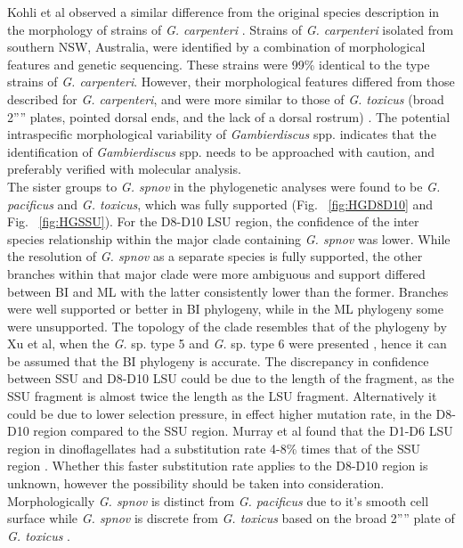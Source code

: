 \documentclass[12pt]{article}
\begin{document}
Kohli et al observed a similar difference from the original species description in the morphology of strains of  \emph{G. carpenteri} \citep{kohli2014high}. Strains of \emph{G. carpenteri} isolated from southern NSW, Australia, were identified by a combination of morphological features and genetic sequencing. These strains were 99\% identical to the type strains of \textit{G. carpenteri}. However, their morphological features differed from those described for \textit{G. carpenteri}, and were more similar to those of \emph{G. toxicus} (broad 2'''' plates, pointed dorsal ends, and the lack of a dorsal rostrum) \citep{kohli2014high,litaker2009taxonomy}.
The potential intraspecific morphological variability of \emph{Gambierdiscus} spp. indicates that the identification of \emph{Gambierdiscus} spp. needs to be approached with caution, and preferably verified with molecular analysis.\\
The sister groups to \emph{G. spnov} in the phylogenetic analyses were found to be \emph{G. pacificus} and \emph{G. toxicus}, which was fully supported (Fig. ~\ref{fig:HGD8D10} and Fig. ~\ref{fig:HGSSU}). For the D8-D10 LSU region, the confidence of the inter species relationship within the major clade containing \emph{G. spnov} was lower.  While the resolution of \emph{G. spnov} as a separate species is fully supported, the other branches within that major clade were more ambiguous and support differed between BI and ML with the latter consistently lower than the former. Branches were well supported or better in BI phylogeny, while in the ML phylogeny some were unsupported. The topology of the clade resembles that of the phylogeny by Xu et al, when the \emph{G.} sp. type 5 and \emph{G.} sp. type 6 were presented \citep{xu2014distribution}, hence it can be assumed that the BI phylogeny is accurate.
The discrepancy in confidence between SSU and D8-D10 LSU could be due to the length of the fragment, as the SSU fragment is almost twice the length as the LSU fragment. Alternatively it could be due to lower selection pressure, in effect higher mutation rate, in the D8-D10 region compared to the SSU region. Murray et al found that the D1-D6 LSU region in dinoflagellates had a substitution rate 4-8\% times that of the SSU region \citep{murray2005improving}. Whether this faster substitution rate applies to the D8-D10 region is unknown, however the possibility should be taken into consideration. \\
Morphologically \emph{G. spnov} is distinct from \emph{G. pacificus} due to it's smooth cell surface \citep{chinain1999morphology} while \emph{G. spnov} is discrete from \emph{G. toxicus} based on the broad 2'''' plate of \emph{G. toxicus} \citep{litaker2009taxonomy}.\\
\end{document}
